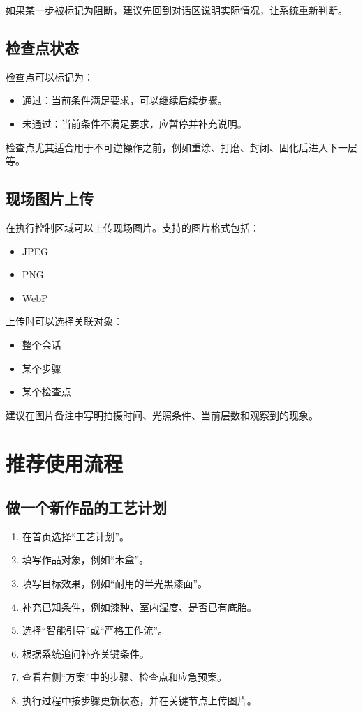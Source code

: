 \documentclass[UTF8,a4paper,12pt]{ctexart}
\begin{document}
如果某一步被标记为阻断，建议先回到对话区说明实际情况，让系统重新判断。

\subsection{检查点状态}

检查点可以标记为：

\begin{itemize}[leftmargin=2em]
  \item 通过：当前条件满足要求，可以继续后续步骤。
  \item 未通过：当前条件不满足要求，应暂停并补充说明。
\end{itemize}

检查点尤其适合用于不可逆操作之前，例如重涂、打磨、封闭、固化后进入下一层等。

\subsection{现场图片上传}

在执行控制区域可以上传现场图片。支持的图片格式包括：

\begin{itemize}[leftmargin=2em]
  \item JPEG
  \item PNG
  \item WebP
\end{itemize}

上传时可以选择关联对象：

\begin{itemize}[leftmargin=2em]
  \item 整个会话
  \item 某个步骤
  \item 某个检查点
\end{itemize}

建议在图片备注中写明拍摄时间、光照条件、当前层数和观察到的现象。

\section{推荐使用流程}

\subsection{做一个新作品的工艺计划}

\begin{enumerate}[leftmargin=2em]
  \item 在首页选择“工艺计划”。
  \item 填写作品对象，例如“木盒”。
  \item 填写目标效果，例如“耐用的半光黑漆面”。
  \item 补充已知条件，例如漆种、室内湿度、是否已有底胎。
  \item 选择“智能引导”或“严格工作流”。
  \item 根据系统追问补齐关键条件。
  \item 查看右侧“方案”中的步骤、检查点和应急预案。
  \item 执行过程中按步骤更新状态，并在关键节点上传图片。
\end{enumerate}
\end{document}
